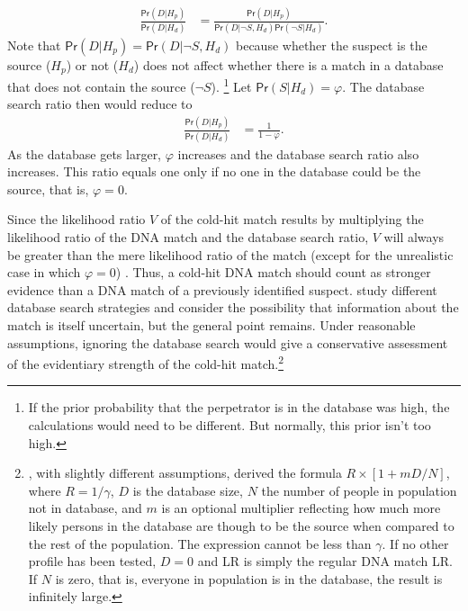\documentclass{article}
\newcommand{\pr}{\mathsf{Pr}}
\begin{document}
\begin{align*}
\frac{\pr(D\vert H_p)}{\pr(D\vert H_d)} & = \frac{\pr(D\vert H_p)}{\pr(D\vert \neg S, H_d) \pr(\neg S \vert H_d)}.
\end{align*}
%
Note that 
$\pr(D\vert H_p)=\pr(D\vert \neg S, H_d)$ because 
whether the suspect is the source ($H_p$) or not ($H_d$) does not affect whether there is a match in a database that does not contain the source ($\neg S$).%
\footnote{If the prior probability that the perpetrator is in the database was high, the calculations would need to be different. But normally, this prior isn't too high.} 
 Let  $\pr(S | H_d)=\varphi$. The database search ratio then would reduce to
%
\begin{align*}
\frac{\pr(D\vert H_p)}{\pr(D\vert H_d)} & = \frac{1}{1-\varphi}.
\end{align*}
%
As the database gets larger, $\varphi$ increases and the database search ratio also increases. This ratio equals one only if no one in the database could be the source, that is, $\varphi=0$.  


Since the likelihood ratio $V$ of the cold-hit match results by multiplying the likelihood ratio of the DNA match and the database search ratio, $V$ will always be greater than the mere likelihood ratio of the match (except for the unrealistic case in which $\varphi=0$) . Thus, a cold-hit DNA match should count as stronger evidence than a DNA match of a previously identified suspect. \citet{dawid1996CoherentAnalysisForensic}  study different database search strategies and consider the possibility that information about the match is itself uncertain, but the general point remains. Under reasonable assumptions, ignoring the database search would give a conservative assessment of the evidentiary strength of the cold-hit match.\footnote{\citet{donnelly1999DNADatabaseSearches}, with slightly different assumptions, derived the formula $R \times [1+mD/N]$, where $R = 1/\gamma$, $D$ is the database size, $N$ the number of people in population not in database, and $m$ is an optional multiplier reflecting how much more likely persons in the database are though to be the source when compared to the rest of the population. The expression cannot be less than $\gamma$. If no other profile has been tested, $D=0$ and LR is simply the regular DNA match LR. If $N$ is zero, that is, everyone in population is in the database, the result is infinitely large.}
\end{document}
